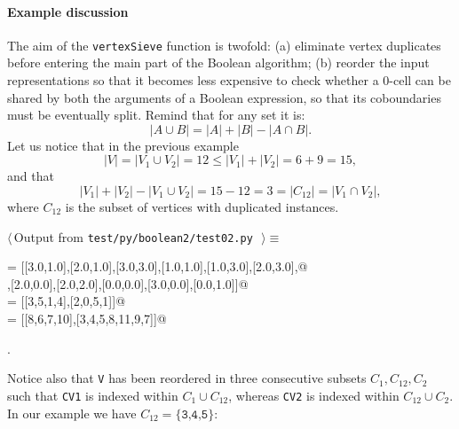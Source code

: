 \documentclass[11pt,oneside]{article}	%
\begin{document}
\paragraph{Example discussion} 
The aim of the \texttt{vertexSieve} function is twofold: (a) eliminate vertex duplicates before entering the main part of the Boolean algorithm; (b) reorder the input representations so that it becomes less expensive to check whether a 0-cell can be shared by both the arguments of a Boolean expression, so that its coboundaries must be eventually split. Remind that for any set it is:
\[
|A\cup B| = |A|+|B|-|A\cap B|.
\]
Let us notice that in the previous example
\[
|V| = |V_1 \cup V_2| = 12 \leq |V_1|+|V_2| = 6+9 = 15,
\]
and that 
\[
|V_1|+|V_2| - |V_1 \cup V_2| = 15 - 12 = 3 = |C_{12}| = |V_1 \cap V_2|,
\]
where $C_{12}$ is the subset of vertices with duplicated instances.
\begin{flushleft} \small \label{scrap10}
$\langle\,$Output from \texttt{test/py/boolean2/test02.py}\nobreak\ {\footnotesize {}}$\,\rangle\equiv$
\vspace{-1ex}
\begin{list}{}{} \item
\mbox{}\verb@V   = [[3.0,1.0],[2.0,1.0],[3.0,3.0],[1.0,1.0],[1.0,3.0],[2.0,3.0],@\\
\mbox{}\verb@       [3.0,2.0],[2.0,0.0],[2.0,2.0],[0.0,0.0],[3.0,0.0],[0.0,1.0]]@\\
\mbox{} = [[3,5,1,4],[2,0,5,1]]@\\
\mbox{} = [[8,6,7,10],[3,4,5,8,11,9,7]]@\\
\mbox{}\verb@@{\NWsep}
\end{list}
\vspace{-1ex}
\footnotesize\addtolength{\baselineskip}{-1ex}
\begin{list}{}{\setlength{\itemsep}{-\parsep}\setlength{\itemindent}{-\leftmargin}}
\item {\NWtxtMacroNoRef}.
\end{list}
\end{flushleft}
Notice also that \texttt{V} has been reordered in three consecutive subsets $C_{1},C_{12},C_{2}$ such that \texttt{CV1} is indexed within $C_{1}\cup C_{12}$, whereas \texttt{CV2} is indexed within $C_{12}\cup C_{2}$. In our example we have  $C_{12}=\{\texttt{3,4,5}\}$: 
\end{document}
